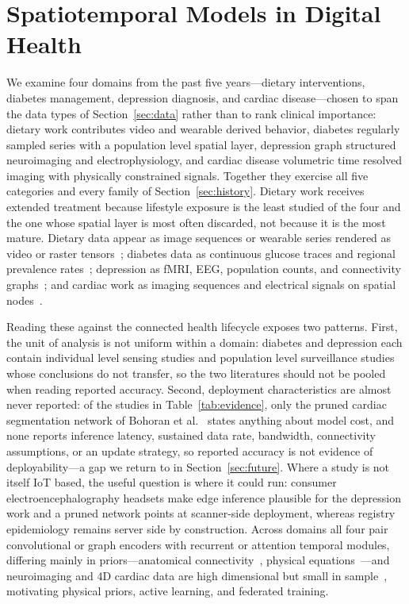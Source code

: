 \documentclass[journal]{IEEEtran}
\newif\ifsubmission
\begin{document}
\section{Spatiotemporal Models in Digital Health}
\label{sec:models}
\ifsubmission
We examine four domains from the past five years---dietary interventions, diabetes management, depression diagnosis, and cardiac disease---chosen to span the data types of Section~\ref{sec:data} rather than to rank clinical importance: dietary work contributes video and wearable derived behavior, diabetes regularly sampled series with a population level spatial layer, depression graph structured neuroimaging and electrophysiology, and cardiac disease volumetric time resolved imaging with physically constrained signals. Together they exercise all five categories and every family of Section~\ref{sec:history}. Dietary work receives extended treatment because lifestyle exposure is the least studied of the four and the one whose spatial layer is most often discarded, not because it is the most mature. Dietary data appear as image sequences or wearable series rendered as video or raster tensors~\cite{Rouast2020IntakeGesture}; diabetes data as continuous glucose traces and regional prevalence rates~\cite{Li2020GluNet,XiaoLi2016DiabetesSpatiotemporal}; depression as fMRI, EEG, population counts, and connectivity graphs~\cite{2,3,4,9}; and cardiac work as imaging sequences and electrical signals on spatial nodes~\cite{5,6,7}.

Reading these against the connected health lifecycle exposes two patterns. First, the unit of analysis is not uniform within a domain: diabetes and depression each contain individual level sensing studies and population level surveillance studies whose conclusions do not transfer, so the two literatures should not be pooled when reading reported accuracy. Second, deployment characteristics are almost never reported: of the studies in Table~\ref{tab:evidence}, only the pruned cardiac segmentation network of Bohoran et al.~\cite{5} states anything about model cost, and none reports inference latency, sustained data rate, bandwidth, connectivity assumptions, or an update strategy, so reported accuracy is not evidence of deployability---a gap we return to in Section~\ref{sec:future}. Where a study is not itself IoT based, the useful question is where it could run: consumer electroencephalography headsets make edge inference plausible for the depression work and a pruned network points at scanner-side deployment, whereas registry epidemiology remains server side by construction. Across domains all four pair convolutional or graph encoders with recurrent or attention temporal modules, differing mainly in priors---anatomical connectivity~\cite{4}, physical equations~\cite{7}---and neuroimaging and 4D cardiac data are high dimensional but small in sample~\cite{4,5,6}, motivating physical priors, active learning, and federated training.
\end{document}
